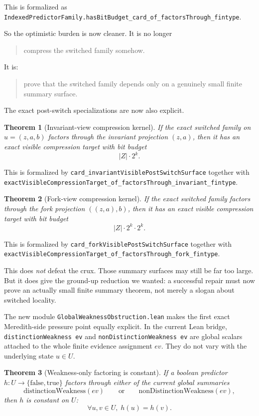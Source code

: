 \documentclass[11pt]{article}
\newtheorem{theorem}{Theorem}[section]
\theoremstyle{remark}
\begin{document}
\noindent
This is formalized as
\texttt{IndexedPredictorFamily.hasBitBudget\_card\_of\_factorsThrough\_fintype}.

So the optimistic burden is now cleaner.  It is no longer
\begin{quote}
compress the switched family somehow.
\end{quote}
It is:
\begin{quote}
prove that the switched family depends only on a genuinely small finite summary
surface.
\end{quote}

The exact post-switch specializations are now also explicit.

\begin{theorem}[Invariant-view compression kernel]
If the exact switched family on \(u=(z,a,b)\) factors through the invariant
projection \((z,a)\), then it has an exact visible compression target with bit
budget
\[
  |Z| \cdot 2^k.
\]
\end{theorem}

\noindent
This is formalized by
\texttt{card\_invariantVisiblePostSwitchSurface} together with
\texttt{exactVisibleCompressionTarget\_of\_factorsThrough\_invariant\_fintype}.

\begin{theorem}[Fork-view compression kernel]
If the exact switched family factors through the fork projection
\(((z,a),b)\), then it has an exact visible compression target with bit budget
\[
  |Z| \cdot 2^k \cdot 2^k.
\]
\end{theorem}

\noindent
This is formalized by
\texttt{card\_forkVisiblePostSwitchSurface} together with
\texttt{exactVisibleCompressionTarget\_of\_factorsThrough\_fork\_fintype}.

This does \emph{not} defeat the crux.  Those summary surfaces may still be far
too large.  But it does give the ground-up reduction we wanted: a successful
repair must now prove an actually small finite summary theorem, not merely a
slogan about switched locality.

The new module \texttt{GlobalWeaknessObstruction.lean} makes the first exact
Meredith-side pressure point equally explicit.  In the current Lean bridge,
\texttt{distinctionWeakness ev} and \texttt{nonDistinctionWeakness ev} are
global scalars attached to the whole finite evidence assignment \(ev\).  They do
not vary with the underlying state \(u \in U\).

\begin{theorem}[Weakness-only factoring is constant]
If a boolean predictor \(h : U \to \{\mathrm{false},\mathrm{true}\}\) factors
through either of the current global summaries
\[
  \mathrm{distinctionWeakness}(ev)
  \qquad \text{or} \qquad
  \mathrm{nonDistinctionWeakness}(ev),
\]
then \(h\) is constant on \(U\):
\[
  \forall u,v \in U,\; h(u) = h(v).
\]
\end{theorem}
\end{document}
